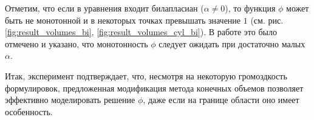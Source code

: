 Отметим, что если в уравнения входит билапласиан ($\alpha \neq 0$), то функция $\phi$ может быть не монотонной и в некоторых точках превышать значение $1$ (см. рис. \ref{fig:result_volumes_bi}, \ref{fig:result_volumes_cyl_bi}). В работе \cite{zipunova_higher_codimension} это было отмечено и указано, что монотонность $\phi$ следует ожидать при достаточно малых $\alpha$.

Итак, эксперимент подтверждает, что, несмотря на некоторую громоздкость формулировок, предложенная модификация метода конечных объемов позволяет эффективно моделировать решение $\phi$, даже если на границе области оно имеет особенность.